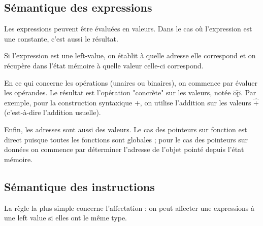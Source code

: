 \subsection{Sémantique des expressions}

Les expressions peuvent être évaluées en valeurs. Dans le cas où l'expression
est une constante, c'est aussi le résultat.

\begin{mathpar}
\end{mathpar}

Si l'expression est une left-value, on établit à quelle adresse elle correspond
et on récupère dans l'état mémoire à quelle valeur celle-ci correspond.

\begin{mathpar}
\end{mathpar}

En ce qui concerne les opérations (unaires ou binaires), on commence par évaluer
les opérandes. Le résultat est l'opération "concrète" sur les valeurs, notée
$\widehat{\textrm{op}}$. Par exemple, pour la construction syntaxique $+$, on
utilise l'addition sur les valeurs $\widehat{+}$ (c'est-à-dire l'addition
usuelle).


Enfin, les adresses sont aussi des valeurs. Le cas des pointeurs sur fonction
est direct puisque toutes les fonctions sont globales ; pour le cas des
pointeurs sur données on commence par déterminer l'adresse de l'objet pointé
depuis l'état mémoire.


\subsection{Sémantique des instructions}

La règle la plus simple concerne l'affectation : on peut affecter une
expressions à une left value si elles ont le même type.

